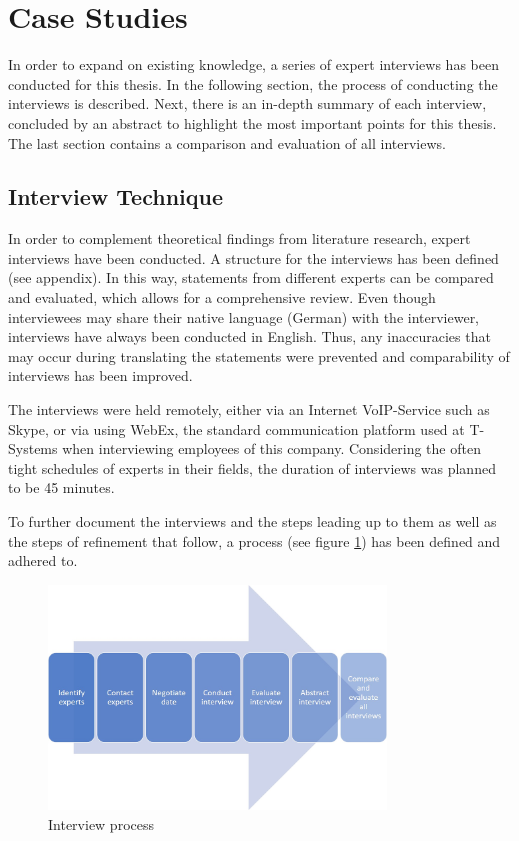 
\section{Case Studies}
\label{sec:Empiry}
In order to expand on existing knowledge, a series of expert interviews has been conducted for this thesis. In the following section, the process of conducting the interviews is described. Next, there is an in-depth summary of each interview, concluded by an abstract to highlight the most important points for this thesis. The last section contains a comparison and evaluation of all interviews.

\subsection{Interview Technique}

In order to complement theoretical findings from literature research, expert interviews have been conducted. A structure for the interviews has been defined (see appendix). In this way, statements from different experts can be compared and evaluated, which allows for a comprehensive review. Even though interviewees may share their native language (German) with the interviewer, interviews have always been conducted in English. Thus, any inaccuracies that may occur during translating the statements were prevented and comparability of interviews has been improved.

The interviews were held remotely, either via an Internet VoIP-Service such as Skype, or via using WebEx, the standard communication platform used at T-Systems when interviewing employees of this company. Considering the often tight schedules of experts in their fields, the duration of interviews was planned to be 45 minutes.

To further document the interviews and the steps leading up to them as well as the steps of refinement that follow, a process (see figure \ref{fig:Intprocess}) has been defined and adhered to. 

\vspace{3mm}
\begin{figure}[htb]
	\centering
	\includegraphics[width=0.8\textwidth]{Pictures/Interview_process}
	\caption{Interview process}
	\label{fig:Intprocess}
\end{figure}

